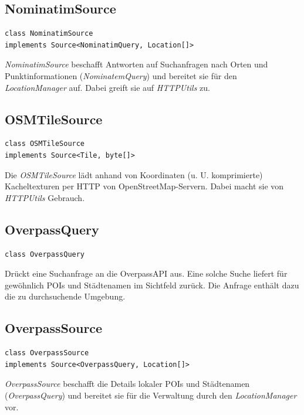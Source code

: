 \documentclass[10pt]{scrreprt}
\begin{document}
\vspace{5mm}
\subsection*{NominatimSource}
\begin{lstlisting}
class NominatimSource
implements Source<NominatimQuery, Location[]>
\end{lstlisting}
\textit{NominatimSource} beschafft Antworten auf Suchanfragen nach Orten und Punktinformationen (\textit{NominatemQuery}) und bereitet sie für den \textit{LocationManager} auf. Dabei greift sie auf \textit{HTTPUtils} zu.\\

\vspace{5mm}
\subsection*{OSMTileSource}
\begin{lstlisting}
class OSMTileSource
implements Source<Tile, byte[]>
\end{lstlisting}
Die \textit{OSMTileSource} lädt anhand von Koordinaten (u. U. komprimierte) Kacheltexturen per HTTP von OpenStreetMap-Servern. Dabei macht sie von \textit{HTTPUtils} Gebrauch.\\

\vspace{5mm}
\subsection*{OverpassQuery}
\begin{lstlisting}
class OverpassQuery
\end{lstlisting}
Drückt eine Suchanfrage an die OverpassAPI aus. Eine solche Suche liefert für gewöhnlich POIs und Städtenamen im Sichtfeld zurück. Die Anfrage enthält dazu die zu durchsuchende Umgebung.\\

\pagebreak
\subsection*{OverpassSource}
\begin{lstlisting}
class OverpassSource
implements Source<OverpassQuery, Location[]>
\end{lstlisting}
\textit{OverpassSource} beschafft die Details lokaler POIs und Städtenamen (\textit{OverpassQuery}) und bereitet sie für die Verwaltung durch den \textit{LocationManager} vor.\\
\end{document}
